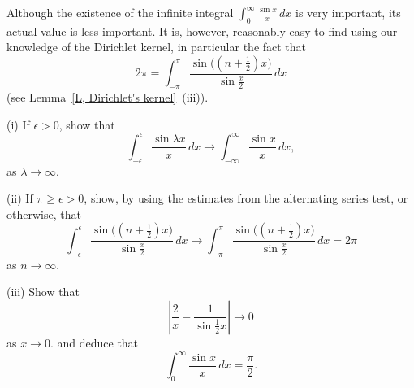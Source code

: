 \begin{question}\label{Q, infinite Dirichlet 2}
Although the existence of the infinite integral
$\int_{0}^{\infty}\frac{\sin x}{x}\,dx$ is very important,
its actual value is less important. It is, however, reasonably
easy to find using our knowledge of the Dirichlet
kernel, in particular the fact that
\[2\pi=\int_{-\pi}^{\pi}\frac{\sin\big((n+\tfrac{1}{2})x\big)}
{\sin \tfrac{x}{2}}\,dx\]
(see Lemma~\ref{L, Dirichlet's kernel}~(iii)).

(i) If $\epsilon>0$, show that
\[\int_{-\epsilon}^{\epsilon}\frac{\sin \lambda x}{x}\,dx
\rightarrow
\int_{-\infty}^{\infty}\frac{\sin x}{x}\,dx,\]
as $\lambda\rightarrow\infty$.

(ii) If $\pi\geq \epsilon>0$, show, by using the
estimates from the alternating series test, or otherwise, that
\[\int_{-\epsilon}^{\epsilon}
\frac{\sin\big((n+\tfrac{1}{2})x\big)}
{\sin \tfrac{x}{2}}\,dx\rightarrow
\int_{-\pi}^{\pi}\frac{\sin\big((n+\tfrac{1}{2})x\big)}
{\sin \tfrac{x}{2}}\,dx=2\pi\]
as $n\rightarrow\infty$.

(iii) Show that
\[\left|\frac{2}{x}-\frac{1}{\sin \tfrac{1}{2}x}\right|\rightarrow 0\]
as $x\rightarrow 0$.
and deduce that
\[\int_{0}^{\infty}\frac{\sin x}{x}\,dx=\frac{\pi}{2}.\]
\end{question}
